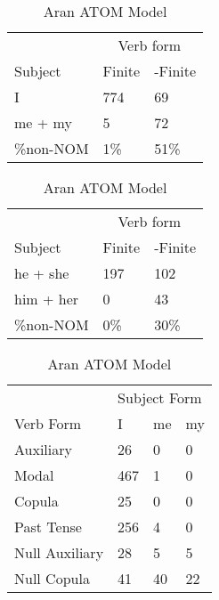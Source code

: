 \begin{table}[]
    \caption{Aran ATOM Model}
\begin{minipage}{0.5\textwidth}
    \centering
    \begin{tabular}{@{}lll@{}}
        \toprule
         &\multicolumn{2}{c}{Verb form}\\
         \cline{2-3}
        Subject & Finite & -Finite \\
        \midrule
        I & 774 & 69 \\
        me + my & 5 & 72 \\
        \hline
        \%non-NOM & 1\% & 51\% \\
        \bottomrule
    \end{tabular}
\end{minipage}
\begin{minipage}{0.5\textwidth}
    \centering
    \begin{tabular}{@{}lll@{}}
        \toprule
         &\multicolumn{2}{c}{Verb form}\\
         \cline{2-3}
        Subject & Finite & -Finite \\
        \midrule
        he + she & 197 & 102 \\
        him + her & 0 & 43 \\
        \hline
        \%non-NOM & 0\% & 30\% \\
        \bottomrule
    \end{tabular}
    \end{minipage}
    \begin{minipage}{0.5\textwidth}
    \centering
    \begin{tabular}{@{}llll@{}}
        \toprule
            &\multicolumn{3}{l}{Subject Form}\\
            \cline{2-4}
        Verb Form & I & me & my \\
        \midrule
        Auxiliary & 26 & 0 & 0 \\
        Modal & 467 & 1 & 0 \\
        Copula & 25 & 0 & 0 \\
        Past Tense & 256 & 4 & 0 \\
        \hline
        Null Auxiliary & 28 & 5 & 5 \\
        Null Copula & 41 & 40 & 22 \\
        \bottomrule
    \end{tabular}

\end{minipage}
\end{table}
